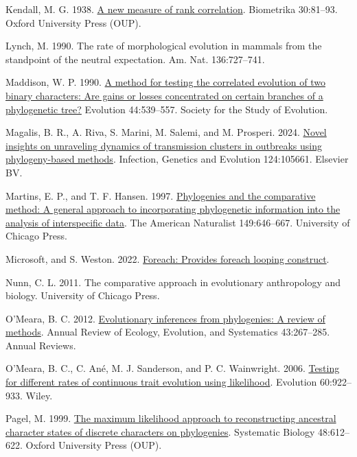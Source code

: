 \documentclass[fleqn,10pt,lineno]{wlpeerj} %
\newlength{\cslhangindent}
\newenvironment{CSLReferences}[2] %
 {\begin{list}{}{%
  \setlength{\itemindent}{0pt}
  \setlength{\leftmargin}{0pt}
  \setlength{\parsep}{0pt}
  \ifodd #1
   \setlength{\leftmargin}{\cslhangindent}
   \setlength{\itemindent}{-1\cslhangindent}
  \fi
  \setlength{\itemsep}{#2\baselineskip}}}
 {\end{list}}
\begin{document}
\begin{CSLReferences}{1}{0}
Kendall, M. G. 1938. \href{https://doi.org/10.1093/biomet/30.1-2.81}{A new measure of rank correlation}. Biometrika 30:81--93. Oxford University Press (OUP).

Lynch, M. 1990. The rate of morphological evolution in mammals from the standpoint of the neutral expectation. Am. Nat. 136:727--741.

Maddison, W. P. 1990. \href{https://doi.org/10.2307/2409435}{A method for testing the correlated evolution of two binary characters: Are gains or losses concentrated on certain branches of a phylogenetic tree?} Evolution 44:539--557. Society for the Study of Evolution.

Magalis, B. R., A. Riva, S. Marini, M. Salemi, and M. Prosperi. 2024. \href{https://doi.org/10.1016/j.meegid.2024.105661}{Novel insights on unraveling dynamics of transmission clusters in outbreaks using phylogeny-based methods}. Infection, Genetics and Evolution 124:105661. Elsevier BV.

Martins, E. P., and T. F. Hansen. 1997. \href{https://doi.org/10.1086/286013}{Phylogenies and the comparative method: A general approach to incorporating phylogenetic information into the analysis of interspecific data}. The American Naturalist 149:646--667. University of Chicago Press.

Microsoft, and S. Weston. 2022. \href{https://CRAN.R-project.org/package=foreach}{Foreach: Provides foreach looping construct}.

Nunn, C. L. 2011. The comparative approach in evolutionary anthropology and biology. University of Chicago Press.

O'Meara, B. C. 2012. \href{https://doi.org/10.1146/annurev-ecolsys-110411-160331}{Evolutionary inferences from phylogenies: A review of methods}. Annual Review of Ecology, Evolution, and Systematics 43:267--285. Annual Reviews.

O'Meara, B. C., C. Ané, M. J. Sanderson, and P. C. Wainwright. 2006. \href{https://doi.org/10.1111/j.0014-3820.2006.tb01171.x}{Testing for different rates of continuous trait evolution using likelihood}. Evolution 60:922--933. Wiley.

Pagel, M. 1999. \href{https://doi.org/10.1080/106351599260184}{The maximum likelihood approach to reconstructing ancestral character states of discrete characters on phylogenies}. Systematic Biology 48:612--622. Oxford University Press (OUP).


\end{CSLReferences}
\end{document}
